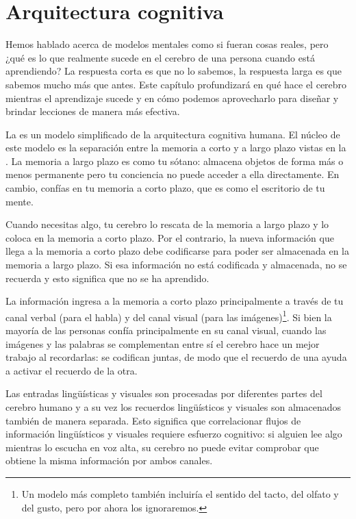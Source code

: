 \chapter{Arquitectura cognitiva}\label{s:architecture}

Hemos hablado acerca de modelos mentales como si fueran cosas reales,
pero ¿qué es lo que realmente sucede en el cerebro de una persona cuando está aprendiendo?
La respuesta corta es que no lo sabemos, la respuesta larga es que sabemos mucho más que antes.
Este capítulo profundizará en qué hace el cerebro mientras el aprendizaje sucede
y en cómo podemos aprovecharlo para diseñar y brindar lecciones de manera más efectiva.



La  es un modelo simplificado de la arquitectura cognitiva humana. 
El núcleo de este modelo es la separación entre la memoria a corto y a largo plazo vistas en la .
La memoria a largo plazo es como tu sótano:
almacena objetos de forma más o menos permanente
pero tu conciencia no puede acceder a ella directamente.
En cambio,
confías en tu memoria a corto plazo,
que es como el escritorio de tu mente.

Cuando necesitas algo,
tu cerebro lo rescata de la memoria a largo plazo  
y lo coloca en la memoria a corto plazo.
Por el contrario, la nueva información que llega a la memoria a corto plazo
debe codificarse para poder ser almacenada en la memoria a largo plazo.
Si esa información no está codificada y almacenada, no se recuerda y esto significa que  
no se ha aprendido.

La información ingresa a la memoria a corto plazo principalmente
a través de tu canal verbal (para el habla)
y del canal visual
(para las imágenes)\footnote{
  Un modelo más completo
  también incluiría el sentido del tacto, del olfato y del gusto,
  pero por ahora los ignoraremos.}.
Si bien la mayoría de las personas confía principalmente en su canal visual,
cuando las imágenes y las palabras se complementan entre sí
el cerebro hace un mejor trabajo al recordarlas:
se codifican juntas,
de modo que el recuerdo de una ayuda a activar el recuerdo de la otra.

Las entradas lingüísticas y visuales son procesadas por diferentes partes del cerebro humano
y a su vez los recuerdos lingüísticos y visuales son almacenados también de manera separada.
Esto significa que correlacionar flujos de información lingüísticos y visuales requiere esfuerzo cognitivo:
si alguien lee algo mientras lo escucha en voz alta,
su cerebro no puede evitar comprobar que obtiene la misma información por ambos canales.

